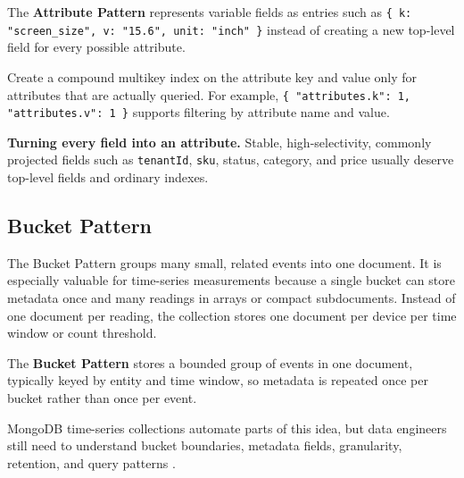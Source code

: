 \begin{definitionbox}
The \textbf{Attribute Pattern} represents variable fields as entries such as \texttt{\{ k: "screen\_size", v: "15.6", unit: "inch" \}} instead of creating a new top-level field for every possible attribute.
\end{definitionbox}

\begin{tipbox}
Create a compound multikey index on the attribute key and value only for attributes that are actually queried. For example, \texttt{\{ "attributes.k": 1, "attributes.v": 1 \}} supports filtering by attribute name and value.
\end{tipbox}

\begin{pitfall}
\textbf{Turning every field into an attribute.} Stable, high-selectivity, commonly projected fields such as \texttt{tenantId}, \texttt{sku}, status, category, and price usually deserve top-level fields and ordinary indexes.
\end{pitfall}

\subsection{Bucket Pattern}
The Bucket Pattern groups many small, related events into one document. It is especially valuable for time-series measurements because a single bucket can store metadata once and many readings in arrays or compact subdocuments. Instead of one document per reading, the collection stores one document per device per time window or count threshold.

\begin{definitionbox}
The \textbf{Bucket Pattern} stores a bounded group of events in one document, typically keyed by entity and time window, so metadata is repeated once per bucket rather than once per event.
\end{definitionbox}

\begin{notebox}
MongoDB time-series collections automate parts of this idea, but data engineers still need to understand bucket boundaries, metadata fields, granularity, retention, and query patterns \cite{mongodbTimeSeriesDocs}.
\end{notebox}

